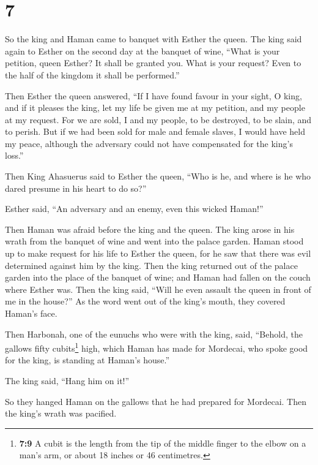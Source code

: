 \hypertarget{section-6}{%
\section{7}\label{section-6}}

 So the king and Haman came to banquet with Esther the
queen.  The king said again to Esther on the second day at
the banquet of wine, ``What is your petition, queen Esther? It shall be
granted you. What is your request? Even to the half of the kingdom it
shall be performed.''

 Then Esther the queen answered, ``If I have found favour
in your sight, O king, and if it pleases the king, let my life be given
me at my petition, and my people at my request.  For we
are sold, I and my people, to be destroyed, to be slain, and to perish.
But if we had been sold for male and female slaves, I would have held my
peace, although the adversary could not have compensated for the king's
loss.''

 Then King Ahasuerus said to Esther the queen, ``Who is
he, and where is he who dared presume in his heart to do so?''

 Esther said, ``An adversary and an enemy, even this
wicked Haman!''

Then Haman was afraid before the king and the queen.  The
king arose in his wrath from the banquet of wine and went into the
palace garden. Haman stood up to make request for his life to Esther the
queen, for he saw that there was evil determined against him by the
king.  Then the king returned out of the palace garden
into the place of the banquet of wine; and Haman had fallen on the couch
where Esther was. Then the king said, ``Will he even assault the queen
in front of me in the house?'' As the word went out of the king's mouth,
they covered Haman's face.

 Then Harbonah, one of the eunuchs who were with the king,
said, ``Behold, the gallows fifty cubits\footnote{\textbf{7:9} A cubit
  is the length from the tip of the middle finger to the elbow on a
  man's arm, or about 18 inches or 46 centimetres.} high, which Haman
has made for Mordecai, who spoke good for the king, is standing at
Haman's house.''

The king said, ``Hang him on it!''

 So they hanged Haman on the gallows that he had prepared
for Mordecai. Then the king's wrath was pacified.

